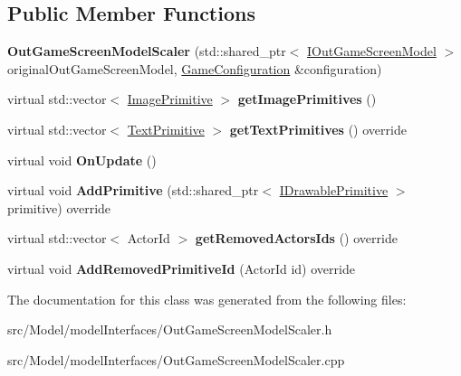 \subsection*{Public Member Functions}
\begin{DoxyCompactItemize}
\item 
{\bfseries Out\+Game\+Screen\+Model\+Scaler} (std\+::shared\+\_\+ptr$<$ \hyperlink{classIOutGameScreenModel}{I\+Out\+Game\+Screen\+Model} $>$ original\+Out\+Game\+Screen\+Model, \hyperlink{classGameConfiguration}{Game\+Configuration} \&configuration)\hypertarget{classOutGameScreenModelScaler_a8016b6a27133e1ba5e5d37b92398194a}{}\label{classOutGameScreenModelScaler_a8016b6a27133e1ba5e5d37b92398194a}

\item 
virtual std\+::vector$<$ \hyperlink{classImagePrimitive}{Image\+Primitive} $>$ {\bfseries get\+Image\+Primitives} ()\hypertarget{classOutGameScreenModelScaler_a2adce59c0b10279b6b888fbaee223c5f}{}\label{classOutGameScreenModelScaler_a2adce59c0b10279b6b888fbaee223c5f}

\item 
virtual std\+::vector$<$ \hyperlink{classTextPrimitive}{Text\+Primitive} $>$ {\bfseries get\+Text\+Primitives} () override\hypertarget{classOutGameScreenModelScaler_a992be1b0384eae1c4c44add302528af6}{}\label{classOutGameScreenModelScaler_a992be1b0384eae1c4c44add302528af6}

\item 
virtual void {\bfseries On\+Update} ()\hypertarget{classOutGameScreenModelScaler_a0bc47b8abedac5e576d86f0e62ad6f45}{}\label{classOutGameScreenModelScaler_a0bc47b8abedac5e576d86f0e62ad6f45}

\item 
virtual void {\bfseries Add\+Primitive} (std\+::shared\+\_\+ptr$<$ \hyperlink{classIDrawablePrimitive}{I\+Drawable\+Primitive} $>$ primitive) override\hypertarget{classOutGameScreenModelScaler_a6888cf839d81c00ec22e680c5370bed8}{}\label{classOutGameScreenModelScaler_a6888cf839d81c00ec22e680c5370bed8}

\item 
virtual std\+::vector$<$ Actor\+Id $>$ {\bfseries get\+Removed\+Actors\+Ids} () override\hypertarget{classOutGameScreenModelScaler_a644194cc68041bce36c00b85e084d1e5}{}\label{classOutGameScreenModelScaler_a644194cc68041bce36c00b85e084d1e5}

\item 
virtual void {\bfseries Add\+Removed\+Primitive\+Id} (Actor\+Id id) override\hypertarget{classOutGameScreenModelScaler_ac78f769c4c788942e69d53125dc19529}{}\label{classOutGameScreenModelScaler_ac78f769c4c788942e69d53125dc19529}

\end{DoxyCompactItemize}


The documentation for this class was generated from the following files\+:\begin{DoxyCompactItemize}
\item 
src/\+Model/model\+Interfaces/Out\+Game\+Screen\+Model\+Scaler.\+h\item 
src/\+Model/model\+Interfaces/Out\+Game\+Screen\+Model\+Scaler.\+cpp\end{DoxyCompactItemize}
